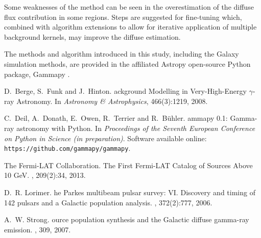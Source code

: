 \documentclass{PoS}
\begin{document}
Some weaknesses of the method can be seen in the overestimation of the diffuse flux contribution in some regions. Steps are suggested for fine-tuning which, combined with algorithm extensions to allow for iterative application of multiple background kernels, may improve the diffuse estimation.

The methods and algorithm introduced in this study, including the Galaxy simulation methods, are provided in the affiliated Astropy open-source Python package, Gammapy \cite{Deil}.

\begin{thebibliography}{99}

D.~Berge, S.~Funk and J.~Hinton.
ackground {M}odelling in {V}ery-{H}igh-{E}nergy $\gamma$-ray {A}stronomy.
\newblock In {\em {A}stronomy \& {A}strophysics}, 466(3):1219, 2008.

C.~Deil, A.~Donath, E.~Owen, R.~Terrier and R.~B{\"{u}}hler.
ammapy {0.1}: {G}amma-ray astronomy with {P}ython.
\newblock In {\em {P}roceedings of the {S}eventh {E}uropean {C}onference on
  {P}ython in {S}cience (in preparation)}.
\newblock Software available online: {\verb|https://github.com/gammapy/gammapy|}.

{The Fermi-LAT Collaboration}.
\newblock The {F}irst {Fermi-LAT} {C}atalog of {S}ources {A}bove 10 {GeV}.
, 209(2):34, 2013.

D.~R. Lorimer.
he {P}arkes multibeam pulsar survey: {VI.} {D}iscovery and timing
  of 142 pulsars and a {G}alactic population analysis.
, 372(2):777,
  2006.

A.~W. Strong.
ource population synthesis and the {G}alactic diffuse gamma-ray
  emission.
, 309, 2007.


\end{thebibliography}
\end{document}
